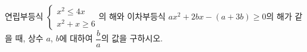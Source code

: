 연립부등식 $\begin{cases} x^2\le 4x \\ x^2+x\ge 6 \end{cases}$의 해와 이차부등식 $ax^2+2bx-(a+3b)\ge 0$의 해가 같을 때, 상수 $a$, $b$에 대하여 $\dfrac{b}{a}$의 값을 구하시오.
